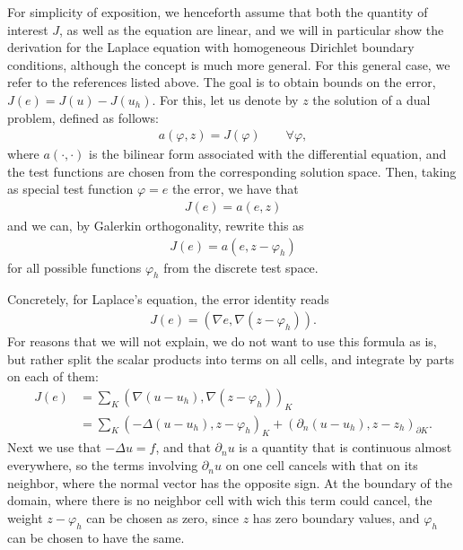 \documentclass{article}
\begin{document}
For simplicity of exposition, we henceforth assume that both the quantity of
interest $J$, as well as the equation are linear, and we will in particular
show the derivation for the Laplace equation with homogeneous Dirichlet
boundary conditions, although the concept is much more general. For this
general case, we refer to the references listed above.  The goal is to obtain
bounds on the error, $J(e)=J(u)-J(u_h)$. For this, let us denote by $z$ the
solution of a dual problem, defined as follows:
\begin{gather}
  a(\varphi,z) = J(\varphi) \qquad \forall \varphi,
\end{gather}
where $a(\cdot,\cdot)$ is the bilinear form associated with the differential
equation, and the test functions are chosen from the corresponding solution
space. Then, taking as special test function $\varphi=e$ the error, we have
that
\begin{gather}
  J(e) = a(e,z)
\end{gather}
and we can, by Galerkin orthogonality, rewrite this as
\begin{gather}
  J(e) = a(e,z-\varphi_h)
\end{gather}
for all possible functions $\varphi_h$ from the discrete test space.

Concretely, for Laplace's equation, the error identity reads
\begin{gather}
  J(e) = (\nabla e, \nabla(z-\varphi_h)).
\end{gather}
For reasons that we will not explain, we do not want to use this formula as
is, but rather split the scalar products into terms on all cells, and
integrate by parts on each of them:
\begin{align*}
  J(e)
  &=
  \sum_K (\nabla (u-u_h), \nabla (z-\varphi_h))_K
  \\
  &=
  \sum_K (-\Delta (u-u_h), z-\varphi_h)_K
  + (\partial_n (u-u_h), z-z_h)_{\partial K}.
\end{align*}
Next we use that $-\Delta u=f$, and that $\partial_n u$ is a quantity that is
continuous almost everywhere, so the terms involving $\partial_n u$ on one
cell cancels with that on its neighbor, where the normal vector has the
opposite sign. At the boundary of the domain, where there is no neighbor cell
with wich this term could cancel, the weight $z-\varphi_h$ can be chosen as
zero, since $z$ has zero boundary values, and $\varphi_h$ can be chosen to
have the same.
\end{document}
